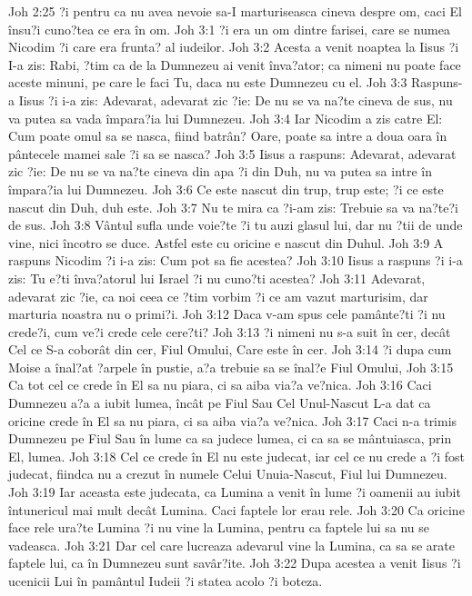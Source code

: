Joh 2:25  ?i pentru ca nu avea nevoie sa-I marturiseasca cineva despre om, caci El însu?i cuno?tea ce era în om.
Joh 3:1  ?i era un om dintre farisei, care se numea Nicodim ?i care era frunta? al iudeilor.
Joh 3:2  Acesta a venit noaptea la Iisus ?i I-a zis: Rabi, ?tim ca de la Dumnezeu ai venit înva?ator; ca nimeni nu poate face aceste minuni, pe care le faci Tu, daca nu este Dumnezeu cu el.
Joh 3:3  Raspuns-a Iisus ?i i-a zis: Adevarat, adevarat zic ?ie: De nu se va na?te cineva de sus, nu va putea sa vada împara?ia lui Dumnezeu.
Joh 3:4  Iar Nicodim a zis catre El: Cum poate omul sa se nasca, fiind batrân? Oare, poate sa intre a doua oara în pântecele mamei sale ?i sa se nasca?
Joh 3:5  Iisus a raspuns: Adevarat, adevarat zic ?ie: De nu se va na?te cineva din apa ?i din Duh, nu va putea sa intre în împara?ia lui Dumnezeu.
Joh 3:6  Ce este nascut din trup, trup este; ?i ce este nascut din Duh, duh este.
Joh 3:7  Nu te mira ca ?i-am zis: Trebuie sa va na?te?i de sus.
Joh 3:8  Vântul sufla unde voie?te ?i tu auzi glasul lui, dar nu ?tii de unde vine, nici încotro se duce. Astfel este cu oricine e nascut din Duhul.
Joh 3:9  A raspuns Nicodim ?i i-a zis: Cum pot sa fie acestea?
Joh 3:10  Iisus a raspuns ?i i-a zis: Tu e?ti înva?atorul lui Israel ?i nu cuno?ti acestea?
Joh 3:11  Adevarat, adevarat zic ?ie, ca noi ceea ce ?tim vorbim ?i ce am vazut marturisim, dar marturia noastra nu o primi?i.
Joh 3:12  Daca v-am spus cele pamânte?ti ?i nu crede?i, cum ve?i crede cele cere?ti?
Joh 3:13  ?i nimeni nu s-a suit în cer, decât Cel ce S-a coborât din cer, Fiul Omului, Care este în cer.
Joh 3:14  ?i dupa cum Moise a înal?at ?arpele în pustie, a?a trebuie sa se înal?e Fiul Omului,
Joh 3:15  Ca tot cel ce crede în El sa nu piara, ci sa aiba via?a ve?nica.
Joh 3:16  Caci Dumnezeu a?a a iubit lumea, încât pe Fiul Sau Cel Unul-Nascut L-a dat ca oricine crede în El sa nu piara, ci sa aiba via?a ve?nica.
Joh 3:17  Caci n-a trimis Dumnezeu pe Fiul Sau în lume ca sa judece lumea, ci ca sa se mântuiasca, prin El, lumea.
Joh 3:18  Cel ce crede în El nu este judecat, iar cel ce nu crede a ?i fost judecat, fiindca nu a crezut în numele Celui Unuia-Nascut, Fiul lui Dumnezeu.
Joh 3:19  Iar aceasta este judecata, ca Lumina a venit în lume ?i oamenii au iubit întunericul mai mult decât Lumina. Caci faptele lor erau rele.
Joh 3:20  Ca oricine face rele ura?te Lumina ?i nu vine la Lumina, pentru ca faptele lui sa nu se vadeasca.
Joh 3:21  Dar cel care lucreaza adevarul vine la Lumina, ca sa se arate faptele lui, ca în Dumnezeu sunt savâr?ite.
Joh 3:22  Dupa acestea a venit Iisus ?i ucenicii Lui în pamântul Iudeii ?i statea acolo ?i boteza.
